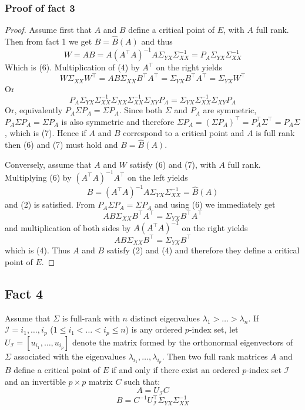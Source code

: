\subsubsection{Proof of fact 3}
\begin{proof}
    Assume first that $A$ and $B$ define a critical point of $E$, with $A$ full rank. Then from fact 1 we get $B = \hat{B}(A)$ and thus
    \[
        W = AB = A(A^\intercal A)^{-1}A\Sigma_{YX}\Sigma_{XX}^{-1} = P_A\Sigma_{YX}\Sigma_{XX}^{-1}
    \]
    Which is (6). Multiplication of (4) by $A^\intercal$ on the right yields
    \[
        W\Sigma_{XX}W^\intercal = AB\Sigma_{XX}B^\intercal A^\intercal = \Sigma_{YX} B^\intercal A^\intercal = \Sigma_{YX} W^\intercal
    \]
    Or
    \[
        P_A\Sigma_{YX}\Sigma_{XX}^{-1}\Sigma_{XX}\Sigma_{XX}^{-1}\Sigma_{XY}P_A = \Sigma_{YX}\Sigma_{XX}^{-1}\Sigma_{XY}P_A
    \]
    Or, equivalently $P_A\Sigma P_A = \Sigma P_A$. Since both $\Sigma$ and $P_A$ are symmetric, $P_A\Sigma P_A = \Sigma P_A$ is also symmetric and therefore $\Sigma P_A = (\Sigma P_A)^\intercal = P_A^\intercal \Sigma^\intercal = P_A\Sigma$, which is (7). Hence if $A$ and $B$ correspond to a critical point and $A$ is full rank then (6) and (7) must hold and $B = \hat{B}(A)$.

    Conversely, assume that $A$ and $W$ satisfy (6) and (7), with $A$ full rank. Multiplying (6) by $(A^\intercal A)^{-1}A^\intercal$ on the left yields
    \[
        B = (A^\intercal A)^{-1}A\Sigma_{YX}\Sigma_{XX}^{-1} = \hat{B}(A)
    \]
    and (2) is satisfied. From $P_A\Sigma P_A = \Sigma P_A$ and using (6) we immediately get 
    \[
        AB\Sigma_{XX}B^\intercal A^\intercal = \Sigma_{YX}B^\intercal A^\intercal
    \]
    and multiplication of both sides by $A(A^\intercal A)^{-1}$ on the right yields 
    \[
        AB\Sigma_{XX}B^\intercal = \Sigma_{YX}B^\intercal
    \]
    which is (4). Thus $A$ and $B$ satisfy (2) and (4) and therefore they define a critical point of $E$.
\end{proof}

\subsection{Fact 4}
Assume that $\Sigma$ is full-rank with $n$ distinct eigenvalues $\lambda_1 > \dots > \lambda_n$. If $\mathcal{I} = {i_1, \dots, i_p}$ ($1 \leq i_1 < \dots < i_p \leq n$) is any ordered $p$-index set, let $U_{\mathcal{I}} = [ u_{i_1}, \dots, u_{i_p} ]$ denote the matrix formed by the orthonormal eigenvectors of $\Sigma$ associated with the eigenvalues $\lambda_{i_1}, \dots, \lambda_{i_p}$. Then two full rank matrices $A$ and $B$ define a critical point of $E$ if and only if there exist an ordered $p$-index set $\mathcal{I}$ and an invertible $p \times p$ matrix $C$ such that:
\begin{equation} \tag{8}
    A = U_{\mathcal{I}}C
\end{equation}
\begin{equation} \tag{9}
    B = C^{-1}U_{\mathcal{I}}^\intercal \Sigma_{YX}\Sigma_{XX}^{-1}
\end{equation}

